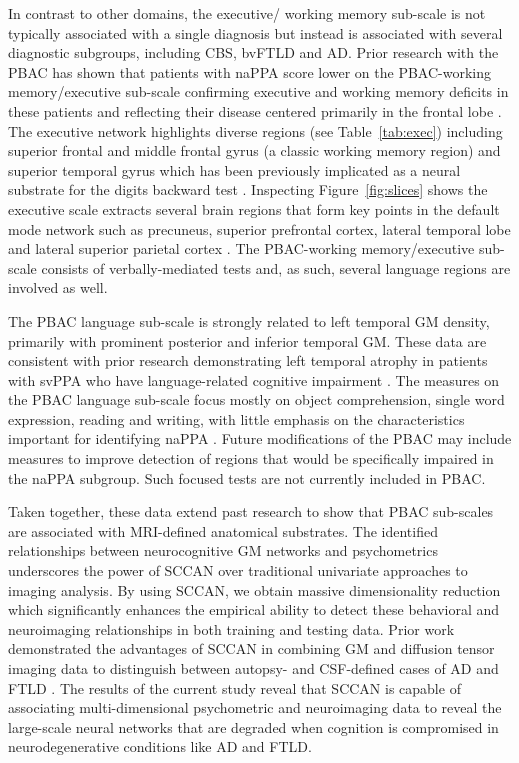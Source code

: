 \documentclass[preprint,authoryear,12pt]{elsarticle}
\begin{document}
In contrast to other domains, the executive/ working memory sub-scale is not typically associated with a single diagnosis but instead is associated with several diagnostic subgroups, including CBS, bvFTLD and AD.  Prior research with the PBAC has shown that patients with naPPA score lower on the PBAC-working memory/executive sub-scale \citet{libon_philadelphia_2011,Libon2007} confirming executive and working memory deficits in these patients and reflecting their disease centered primarily in the frontal lobe \citet{Gunawardena2010,Rogalski2011}.  The executive network highlights diverse regions (see Table~\ref{tab:exec}) including superior frontal and middle frontal gyrus (a classic working memory region) and superior temporal gyrus which has been previously implicated as a neural substrate for the digits backward test \citet{Li2012}.  Inspecting Figure~\ref{fig:slices} shows the executive scale extracts several brain regions that form key points in the default mode network such as precuneus, superior prefrontal cortex, lateral temporal lobe and lateral superior parietal cortex \citet{Buckner2008}.  The PBAC-working memory/executive sub-scale consists of verbally-mediated tests and, as such, several language regions are involved as well.  

The PBAC language sub-scale is strongly related to left temporal GM density, primarily with prominent posterior and inferior temporal GM.  These data are consistent with prior research demonstrating left temporal atrophy in patients with svPPA who have language-related cognitive impairment \citet{Bonner2009,Williams20051042}.  The measures on the PBAC language sub-scale focus mostly on object comprehension, single word expression, reading and writing, with little emphasis on the characteristics important for identifying naPPA \citet{Gorno-Tempini20111006}.  Future modifications of the PBAC may include measures to improve detection of regions that would be specifically impaired in the naPPA subgroup.  Such focused tests are not currently included in PBAC.

Taken together, these data extend past research to show that PBAC sub-scales are associated with MRI-defined anatomical substrates.  The identified relationships between neurocognitive GM networks and psychometrics underscores the power of SCCAN over traditional univariate approaches to imaging analysis.  By using SCCAN, we obtain massive dimensionality reduction which significantly enhances the empirical ability to detect these behavioral and neuroimaging relationships in both training and testing data.  Prior work demonstrated the advantages of SCCAN in combining GM and diffusion tensor imaging data to distinguish between autopsy- and CSF-defined cases of AD and FTLD \citet{Avants2010b}.  The results of the current study reveal that SCCAN is capable of associating multi-dimensional psychometric and neuroimaging data to reveal the large-scale neural networks that are degraded when cognition is compromised in neurodegenerative conditions like AD and FTLD.
\end{document}

